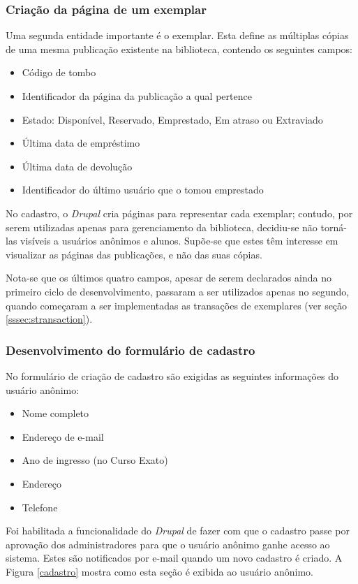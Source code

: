 \documentclass[a4paper]{article}
\begin{document}
\subsubsection{Criação da página de um exemplar}
Uma segunda entidade importante é o exemplar. Esta define as múltiplas cópias de uma mesma publicação existente na biblioteca, contendo os seguintes campos:
\begin{itemize}
\item Código de tombo
\item Identificador da página da publicação a qual pertence
\item Estado: Disponível, Reservado, Emprestado, Em atraso ou Extraviado 
\item Última data de empréstimo
\item Última data de devolução
\item Identificador do último usuário que o tomou emprestado
\end{itemize}

No cadastro, o \textit{Drupal} cria páginas para representar cada exemplar; contudo, por serem utilizadas apenas para gerenciamento da biblioteca, decidiu-se não torná-las visíveis a usuários anônimos e alunos. Supõe-se que estes têm interesse em visualizar as páginas das publicações, e não das suas cópias.

Nota-se que os últimos quatro campos, apesar de serem declarados ainda no primeiro ciclo de desenvolvimento, passaram a ser utilizados apenas no segundo, quando começaram a ser implementadas as transações de exemplares (ver seção \ref{sssec:stransaction}).


\subsubsection{Desenvolvimento do formulário de cadastro}
No formulário de criação de cadastro são exigidas as seguintes informações do usuário anônimo:
\begin{itemize}
\item Nome completo
\item Endereço de e-mail
\item Ano de ingresso (no Curso Exato)
\item Endereço
\item Telefone
\end{itemize}

Foi habilitada a funcionalidade do \textit{Drupal} de fazer com que o cadastro passe por aprovação dos administradores para que o usuário anônimo ganhe acesso ao sistema. Estes são notificados por e-mail quando um novo cadastro é criado. A Figura \ref{cadastro} mostra como esta seção é exibida ao usuário anônimo.
\end{document}

